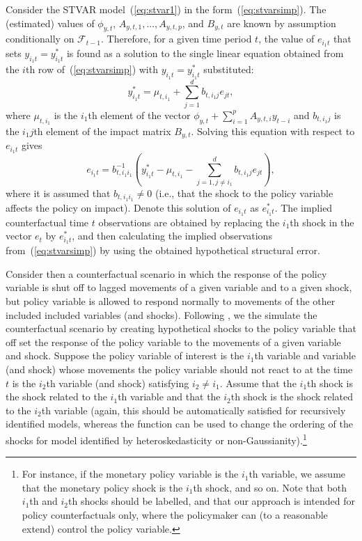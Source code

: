 \documentclass[nojss]{jss}
\begin{document}
Consider the STVAR model~(\ref{eq:stvar1}) in the form~(\ref{eq:stvarsimp}). The (estimated) values of $\phi_{y,t}$, $A_{y,t,1},...,A_{y,t,p}$, and $B_{y,t}$ are known by assumption conditionally on $\mathcal{F}_{t-1}$. Therefore, for a given time period $t$, the value of $e_{i_1t}$ that sets $y_{i_1t}=y_{i_1t}^{*}$ is found as a solution to the single linear equation obtained from the $i$th row of~(\ref{eq:stvarsimp}) with $y_{i_1t}=y_{i_1t}^{*}$ substituted:
\begin{equation}
 y_{i_1t}^{*} = \mu_{t,i_1} + \sum_{j=1}^d b_{t,i_1j} e_{jt},
\end{equation}
where $\mu_{t,i_1}$ is the $i_1$th element of the vector $\phi_{y,t} + \sum_{i=1}^pA_{y,t,i}y_{t-i}$ and $b_{t,i_1j}$ is the $i_1j$th element of the impact matrix $B_{y,t}$. Solving this equation with respect to $e_{i_1t}$ gives
\begin{equation}\label{eq:val_e_t}
e_{i_1t} = b_{t,i_1i_1}^{-1}\left(y_{i_1t}^{*} - \mu_{t,i_1} - \sum_{j=1, j\neq i_1}^d b_{t,i_1j} e_{jt}\right),
\end{equation}
where it is assumed that $b_{t,i_1i_1}\neq 0$ (i.e., that the shock to the policy variable affects the policy on impact). Denote this solution of $e_{i_1t}$ as $e_{i_1t}^{*}$. The implied counterfactual time $t$ observations are obtained by replacing the $i_1$th shock in the vector $e_t$ by $e_{i_1t}^{*}$, and then calculating the implied observations from~(\ref{eq:stvarsimp}) by using the obtained hypothetical structural error.

Consider then a counterfactual scenario in which the response of the policy variable is shut off to lagged movements of a given variable and to a given shock, but policy variable is allowed to respond normally to movements of the other included included variables (and shocks). Following \citet[][who consider a closely related type of counterfactual]{Kilian+Lewis:2011}, we the simulate the counterfactual scenario by creating hypothetical shocks to the policy variable that off set the response of the policy variable to the movements of a given variable and shock. Suppose the policy variable of interest is the $i_1$th variable and variable (and shock) whose movements the policy variable should not react to at the time $t$ is the $i_2$th variable (and shock) satisfying $i_2\neq i_1$. Assume that the $i_1$th shock is the shock related to the $i_1$th variable and that the $i_2$th shock is the shock related to the $i_2$th variable (again, this should be automatically satisfied for recursively identified models, whereas the function  can be used to change the ordering of the shocks for model identified by heteroskedasticity or non-Gaussianity).\footnote{For instance, if the monetary policy variable is the $i_1$th variable, we assume that the monetary policy shock is the $i_1$th shock, and so on. Note that both $i_1$th and $i_2$th shocks should be labelled, and that our approach is intended for policy counterfactuals only, where the policymaker can (to a reasonable extend) control the policy variable.}
\end{document}
